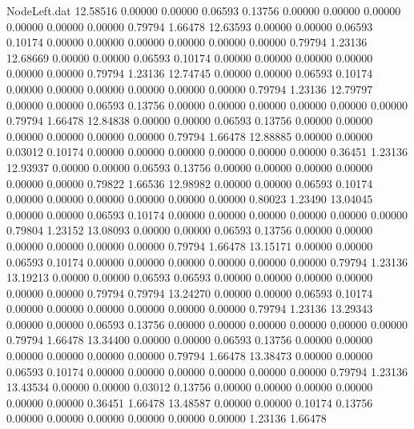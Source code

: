\begin{filecontents}{NodeLeft.dat}
  12.58516    0.00000    0.00000     0.06593    0.13756    0.00000    0.00000    0.00000    0.00000    0.00000    0.00000    0.79794    1.66478
  12.63593    0.00000    0.00000     0.06593    0.10174    0.00000    0.00000    0.00000    0.00000    0.00000    0.00000    0.79794    1.23136
  12.68669    0.00000    0.00000     0.06593    0.10174    0.00000    0.00000    0.00000    0.00000    0.00000    0.00000    0.79794    1.23136
  12.74745    0.00000    0.00000     0.06593    0.10174    0.00000    0.00000    0.00000    0.00000    0.00000    0.00000    0.79794    1.23136
  12.79797    0.00000    0.00000     0.06593    0.13756    0.00000    0.00000    0.00000    0.00000    0.00000    0.00000    0.79794    1.66478
  12.84838    0.00000    0.00000     0.06593    0.13756    0.00000    0.00000    0.00000    0.00000    0.00000    0.00000    0.79794    1.66478
  12.88885    0.00000    0.00000     0.03012    0.10174    0.00000    0.00000    0.00000    0.00000    0.00000    0.00000    0.36451    1.23136
  12.93937    0.00000    0.00000     0.06593    0.13756    0.00000    0.00000    0.00000    0.00000    0.00000    0.00000    0.79822    1.66536
  12.98982    0.00000    0.00000     0.06593    0.10174    0.00000    0.00000    0.00000    0.00000    0.00000    0.00000    0.80023    1.23490
  13.04045    0.00000    0.00000     0.06593    0.10174    0.00000    0.00000    0.00000    0.00000    0.00000    0.00000    0.79804    1.23152
  13.08093    0.00000    0.00000     0.06593    0.13756    0.00000    0.00000    0.00000    0.00000    0.00000    0.00000    0.79794    1.66478
  13.15171    0.00000    0.00000     0.06593    0.10174    0.00000    0.00000    0.00000    0.00000    0.00000    0.00000    0.79794    1.23136
  13.19213    0.00000    0.00000     0.06593    0.06593    0.00000    0.00000    0.00000    0.00000    0.00000    0.00000    0.79794    0.79794
  13.24270    0.00000    0.00000     0.06593    0.10174    0.00000    0.00000    0.00000    0.00000    0.00000    0.00000    0.79794    1.23136
  13.29343    0.00000    0.00000     0.06593    0.13756    0.00000    0.00000    0.00000    0.00000    0.00000    0.00000    0.79794    1.66478
  13.34400    0.00000    0.00000     0.06593    0.13756    0.00000    0.00000    0.00000    0.00000    0.00000    0.00000    0.79794    1.66478
  13.38473    0.00000    0.00000     0.06593    0.10174    0.00000    0.00000    0.00000    0.00000    0.00000    0.00000    0.79794    1.23136
  13.43534    0.00000    0.00000     0.03012    0.13756    0.00000    0.00000    0.00000    0.00000    0.00000    0.00000    0.36451    1.66478
  13.48587    0.00000    0.00000     0.10174    0.13756    0.00000    0.00000    0.00000    0.00000    0.00000    0.00000    1.23136    1.66478

\end{filecontents}
